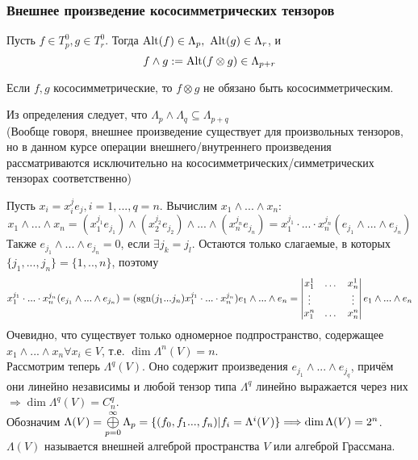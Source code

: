 \subsubsection*{Внешнее произведение кососимметрических тензоров}
\begin{definition}
    Пусть $f \in T_p^0, g \in T_r^0$. Тогда $\textup{Alt}(f) \in \Lambda_p, \ \textup{Alt}(g) \in \Lambda_r$, и
    \[f \wedge g := \textup{Alt}(f \otimes g) \in \Lambda_{p+r}\]
\end{definition}
\begin{remark}
    Если $f, g$ кососимметрические, то $f \otimes g$ не обязано быть кососимметрическим.
\end{remark}
Из определения следует, что $\Lambda_p \wedge \Lambda_q \subseteq \Lambda_{p+q}$\\
(Вообще говоря, внешнее произведение существует для произвольных тензоров, но в данном курсе операции внешнего/внутреннего произведения рассматриваются исключительно на кососимметрических/симметрических тензорах соответственно)

Пусть $x_i = x_i^je_j, i = 1,...,q=n$. Вычислим $x_1\wedge...\wedge x_n$:
\[x_1\wedge...\wedge x_n = (x_1^{j_1}e_{j_1})\wedge(x_2^{j_2}e_{j_2})\wedge...\wedge(x_n^{j_n}e_{j_n}) = x_1^{j_1}\cdot...\cdot x_n^{j_n}(e_{j_1}\wedge...\wedge e_{j_n})\]
Также $e_{j_1}\wedge...\wedge e_{j_n} = 0$, если $\exists j_k = j_l$. Остаются только слагаемые, в которых $\{j_1,...,j_n\} = \{1,..,n\}$, поэтому
\[x_1^{j_1}\cdot...\cdot x_n^{j_n}(e_{j_1}\wedge...\wedge e_{j_n}) = (\sgn(j_1...j_n)x_1^{j_1}\cdot...\cdot x_n^{j_n})e_1\wedge...\wedge e_n = \begin{vmatrix} x_1^1 & \dots & x_n^1 \\ \vdots & \null & \vdots \\ x_1^n & \dots & x_n^n \end{vmatrix}e_1\wedge...\wedge e_n\]
Очевидно, что существует только одномерное подпространство, содержащее $x_1\wedge...\wedge x_n \forall x_i \in V$, т.е. $\dim \Lambda^n(V) = n$.\\
Рассмотрим теперь $\Lambda^q(V)$. Оно содержит произведения $e_{j_1}\wedge...\wedge e_{j_q}$, причём они линейно независимы и любой тензор типа $\Lambda^q$ линейно выражается через них $\Longrightarrow \dim \Lambda^q(V) = C_n^q$.\\
Обозначим $\Lambda(V) = \circledplus \limits_{p = 0}^\infty \Lambda_p = \{(f_0,f_1...,f_n)|f_i = \Lambda^i(V)\} \Longrightarrow \dim \Lambda(V) = 2^n$.
\\$\Lambda(V)$ называется внешней алгеброй пространства $V$ или алгеброй Грассмана.
